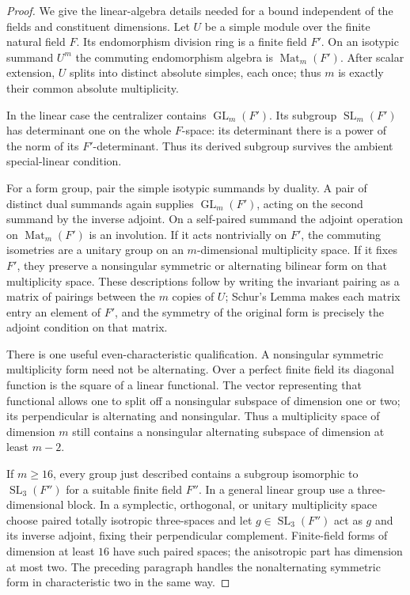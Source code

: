 \begin{proof}
We give the linear-algebra details needed for a bound independent
of the fields and constituent dimensions.  Let $U$ be a simple
module over the finite natural field $F$.  Its endomorphism
division ring is a finite field $F'$.  On an isotypic summand
$U^m$ the commuting endomorphism algebra is
$\operatorname{Mat}_m(F')$.  After scalar extension, $U$ splits
into distinct absolute simples, each once; thus $m$ is exactly
their common absolute multiplicity.

In the linear case the centralizer contains
$\operatorname{GL}_m(F')$.  Its subgroup
$\operatorname{SL}_m(F')$ has determinant one on the whole
$F$-space: its determinant there is a power of the norm of its
$F'$-determinant.  Thus its derived subgroup survives the
ambient special-linear condition.

For a form group, pair the simple isotypic summands by duality.
A pair of distinct dual summands again supplies
$\operatorname{GL}_m(F')$, acting on the second summand by the
inverse adjoint.  On a self-paired summand the adjoint operation
on $\operatorname{Mat}_m(F')$ is an involution.  If it acts
nontrivially on $F'$, the commuting isometries are a unitary
group on an $m$-dimensional multiplicity space.  If it fixes
$F'$, they preserve a nonsingular symmetric or alternating
bilinear form on that multiplicity space.  These descriptions
follow by writing the invariant pairing as a matrix of pairings
between the $m$ copies of $U$; Schur's Lemma makes each matrix
entry an element of $F'$, and the symmetry of the original form
is precisely the adjoint condition on that matrix.

There is one useful even-characteristic qualification.  A
nonsingular symmetric multiplicity form need not be alternating.
Over a perfect finite field its diagonal function is the square
of a linear functional.  The vector representing that functional
allows one to split off a nonsingular subspace of dimension one
or two; its perpendicular is alternating and nonsingular.
Thus a multiplicity space of dimension $m$ still contains a
nonsingular alternating subspace of dimension at least $m-2$.

If $m\ge16$, every group just described contains a subgroup
isomorphic to $\operatorname{SL}_3(F'')$ for a suitable finite
field $F''$.  In a general linear group use a three-dimensional
block.  In a symplectic, orthogonal, or unitary multiplicity
space choose paired totally isotropic three-spaces and let
$g\in\operatorname{SL}_3(F'')$ act as $g$ and its inverse
adjoint, fixing their perpendicular complement.  Finite-field
forms of dimension at least $16$ have such paired spaces;
the anisotropic part has dimension at most two.  The preceding
paragraph handles the nonalternating symmetric form in
characteristic two in the same way.


\end{proof}
